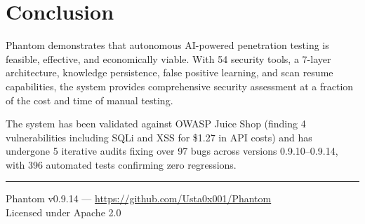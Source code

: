 \documentclass[12pt,a4paper]{article}
\begin{document}
\section{Conclusion}

Phantom demonstrates that autonomous AI-powered penetration testing is
feasible, effective, and economically viable. With 54 security tools,
a 7-layer architecture, knowledge persistence, false positive learning,
and scan resume capabilities, the system provides comprehensive security
assessment at a fraction of the cost and time of manual testing.

The system has been validated against OWASP Juice Shop (finding 4
vulnerabilities including SQLi and XSS for \$1.27 in API costs) and
has undergone 5 iterative audits fixing over 97 bugs across versions
0.9.10--0.9.14, with 396 automated tests confirming zero regressions.

\vfill
\noindent\rule{\textwidth}{0.4pt}
\begin{center}
    \small
    Phantom v0.9.14 — \url{https://github.com/Usta0x001/Phantom}\\
    Licensed under Apache 2.0
\end{center}
\end{document}
